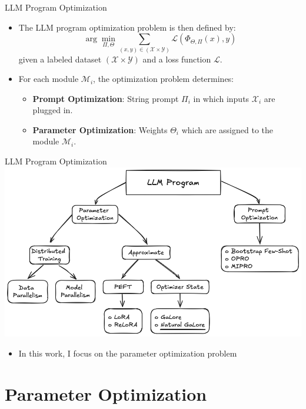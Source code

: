 \documentclass{beamer}
\begin{document}
\begin{frame}{LLM Program Optimization}
    \begin{itemize}
        \item The LLM program optimization problem is then defined by: 
            \[
            \arg \min_{\Pi, \Theta} \sum_{\left(x,y\right)\in \left(\mathcal{X} \times \mathcal{Y}\right)}\mathcal{L}(\Phi_{\Theta, \Pi}(x), y)
            \]
            given a labeled dataset \(\left(\mathcal{X} \times \mathcal{Y}\right)\) and a loss function \(\mathcal{L}\).
        \item For each module \(\mathcal{M}_i\), the optimization problem determines:
            \begin{itemize}
                \item \textbf{Prompt Optimization}: String prompt \(\Pi_i\) in which inputs \(\mathcal{X}_i\) are plugged in.
                \item \textbf{Parameter Optimization}: Weights \(\Theta_i\) which are assigned to the module \(\mathcal{M}_i\).
            \end{itemize}
    \end{itemize}
\end{frame}

\begin{frame}{LLM Program Optimization}
    \includegraphics[width=\textwidth]{figures/LLM Program Optimization.png}
    \begin{itemize}
        \item In this work, I focus on the parameter optimization problem
    \end{itemize}
\end{frame}

\section{Parameter Optimization}
\end{document}
